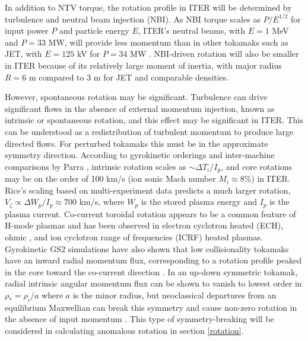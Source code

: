 \documentclass{article}
\numberwithin{figure}{section}
\numberwithin{equation}{section}
\begin{document}
In addition to NTV torque, the rotation profile in ITER will be determined by turbulence and neutral beam injection (NBI). 
As NBI torque scales as $P/E^{1/2}$ for input power $P$ and particle energy $E$, ITER's neutral beams, with $E = 1$ MeV and $P = 33$ MW, will provide less momentum than in other tokamaks such as JET, with $E = 125$ kV for $P = 34$ MW \cite{Ciric2011}. NBI-driven rotation will also be smaller in ITER because of its relatively large moment of inertia, with major radius $R = 6$ m compared to 3 m for JET and comparable densities. 

However, spontaneous rotation may be significant. Turbulence can drive significant flows in the absence of external momentum injection, known as intrinsic or spontaneous rotation, and this effect may be significant in ITER. This can be understood as a redistribution of turbulent momentum to produce large directed flows. For perturbed tokamaks this must be in the approximate symmetry direction. According to gyrokinetic orderings and inter-machine comparisons by Parra \cite{Parra2012}, intrinsic rotation scales as $\sim \Delta T_i/I_p$, and core rotations may be on the order of 100 km/s (ion sonic Mach number $M_i \approx 8\%$) in ITER. Rice's scaling based on multi-experiment data \cite{Rice2007} predicts a much larger rotation, $V_{\zeta} \propto \Delta W_p/I_p \approx 700$ km/s, where $W_p$ is the stored plasma energy and $I_p$ is the plasma current. Co-current toroidal rotation appears to be a common feature of H-mode plasmas and has been observed in electron cyclotron heated (ECH)\cite{DeGrassie2007}, ohmic \cite{DeGrassie2007}, and ion cyclotron range of frequencies (ICRF) \cite{Noterdaeme2003} heated plasmas. Gyrokinetic GS2 simulations have also shown that low collisionality tokamaks have an inward radial momentum flux, corresponding to a rotation profile peaked in the core toward the co-current direction \cite{Barnes2013}. In an up-down symmetric tokamak, radial intrinsic angular momentum flux can be shown to vanish to lowest order in $\rho_* = \rho_i/a$ where $a$ is the minor radius, but neoclassical departures from an equilibrium Maxwellian can break this symmetry and cause non-zero rotation in the absence of input momentum \cite{Barnes2013}. This type of symmetry-breaking will be considered in calculating anomalous rotation in section \ref{rotation}. 
\end{document}
